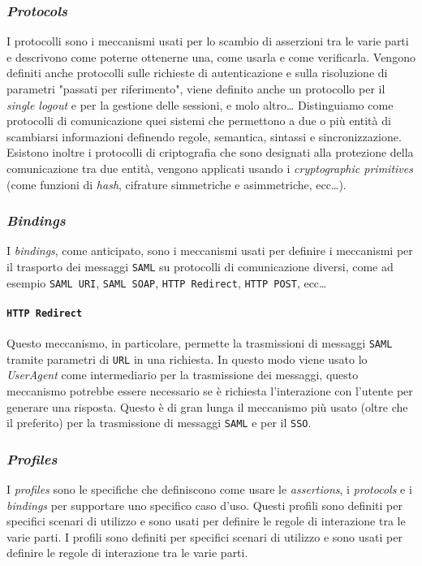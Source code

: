         \subsubsection{\textit{Protocols}}
            I protocolli sono i meccanismi usati per lo scambio di asserzioni tra le varie parti e descrivono come poterne ottenerne una, come usarla e come verificarla. Vengono definiti anche protocolli sulle richieste di autenticazione e sulla risoluzione di parametri "passati per riferimento", viene definito anche un protocollo per il \textit{single logout} e per la gestione delle sessioni, e molo altro\dots\newline
            Distinguiamo come protocolli di comunicazione quei sistemi che permettono a due o più entità di scambiarsi informazioni definendo regole, semantica, sintassi e sincronizzazione. Esistono inoltre i protocolli di criptografia che sono designati alla protezione della comunicazione tra due entità, vengono applicati usando i \textit{cryptographic primitives} (come funzioni di \textit{hash}, cifrature simmetriche e asimmetriche, ecc\dots).
        \subsubsection{\textit{Bindings}}
            I \textit{bindings}, come anticipato, sono i meccanismi usati per definire i meccanismi per il trasporto dei messaggi \texttt{SAML} su protocolli di comunicazione diversi, come ad esempio \texttt{SAML URI}, \texttt{SAML SOAP}, \texttt{HTTP Redirect}, \texttt{HTTP POST}, ecc\dots
            \paragraph{\texttt{HTTP Redirect}} Questo meccanismo, in particolare, permette la trasmissioni di messaggi \texttt{SAML} tramite parametri di \texttt{URL} in una richiesta. In questo modo viene usato lo \textit{UserAgent} come intermediario per la trasmissione dei messaggi, questo meccanismo potrebbe essere necessario se è richiesta l'interazione con l'utente per generare una risposta. Questo è di gran lunga il meccanismo più usato (oltre che il preferito) per la trasmissione di messaggi \texttt{SAML} e per il \texttt{SSO}.
        \subsubsection{\textit{Profiles}}
            I \textit{profiles} sono le specifiche che definiscono come usare le \textit{assertions}, i \textit{protocols} e i \textit{bindings} per supportare uno specifico caso d'uso. Questi profili sono definiti per specifici scenari di utilizzo e sono usati per definire le regole di interazione tra le varie parti. I profili sono definiti per specifici scenari di utilizzo e sono usati per definire le regole di interazione tra le varie parti. 
